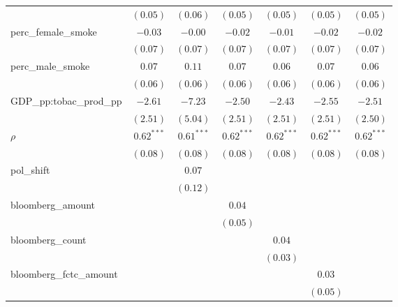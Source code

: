 \begin{table}[!h]
\begin{center}
\begin{tabular}{l c c c c c c }
                        & $(0.05)$     & $(0.06)$     & $(0.05)$     & $(0.05)$     & $(0.05)$     & $(0.05)$     \\
perc\_female\_smoke     & $-0.03$      & $-0.00$      & $-0.02$      & $-0.01$      & $-0.02$      & $-0.02$      \\
                        & $(0.07)$     & $(0.07)$     & $(0.07)$     & $(0.07)$     & $(0.07)$     & $(0.07)$     \\
perc\_male\_smoke       & $0.07$       & $0.11$       & $0.07$       & $0.06$       & $0.07$       & $0.06$       \\
                        & $(0.06)$     & $(0.06)$     & $(0.06)$     & $(0.06)$     & $(0.06)$     & $(0.06)$     \\
GDP\_pp:tobac\_prod\_pp & $-2.61$      & $-7.23$      & $-2.50$      & $-2.43$      & $-2.55$      & $-2.51$      \\
                        & $(2.51)$     & $(5.04)$     & $(2.51)$     & $(2.51)$     & $(2.51)$     & $(2.50)$     \\
$\rho$                  & $0.62^{***}$ & $0.61^{***}$ & $0.62^{***}$ & $0.62^{***}$ & $0.62^{***}$ & $0.62^{***}$ \\
                        & $(0.08)$     & $(0.08)$     & $(0.08)$     & $(0.08)$     & $(0.08)$     & $(0.08)$     \\
pol\_shift              &              & $0.07$       &              &              &              &              \\
                        &              & $(0.12)$     &              &              &              &              \\
bloomberg\_amount       &              &              & $0.04$       &              &              &              \\
                        &              &              & $(0.05)$     &              &              &              \\
bloomberg\_count        &              &              &              & $0.04$       &              &              \\
                        &              &              &              & $(0.03)$     &              &              \\
bloomberg\_fctc\_amount &              &              &              &              & $0.03$       &              \\
                        &              &              &              &              & $(0.05)$     &              \\

\end{tabular}
\end{center}
\end{table}
